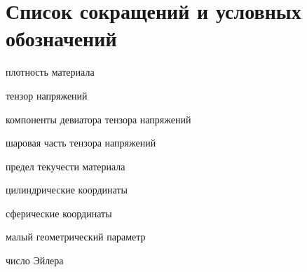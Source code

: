 \chapter*{Список сокращений и условных обозначений} %
\begin{description}[align=right,leftmargin=3.5cm]
\item[\(\varrho\)] плотность материала
\item[\(\sigma_{ij}\)] тензор напряжений
\item[\(s_{ij}\)] компоненты девиатора тензора напряжений
\item[\(p\)] шаровая часть тензора напряжений
\item[\(\sigma_{s}\)] предел текучести материала
\item[\(r, z, \theta\)] цилиндрические координаты
\item[\(r, \theta, \phi\)] сферические координаты
\item[\(\alpha\)] малый геометрический параметр
\item[Eu] число Эйлера
\end{description}
